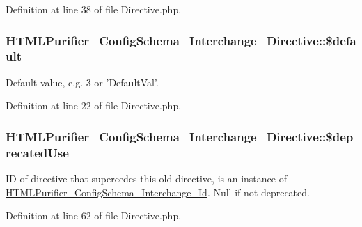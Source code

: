Definition at line 38 of file Directive.\+php.

\hypertarget{classHTMLPurifier__ConfigSchema__Interchange__Directive_a85b4dde959b966c7c449a3a1c82903e9}{
\subsubsection[{\$default}]{\setlength{\rightskip}{0pt plus 5cm}H\+T\+M\+L\+Purifier\+\_\+\+Config\+Schema\+\_\+\+Interchange\+\_\+\+Directive\+::\$default}}\label{classHTMLPurifier__ConfigSchema__Interchange__Directive_a85b4dde959b966c7c449a3a1c82903e9}
Default value, e.\+g. 3 or 'Default\+Val'. 

Definition at line 22 of file Directive.\+php.

\hypertarget{classHTMLPurifier__ConfigSchema__Interchange__Directive_ace5b3be427b3ef113d5eb2ded908c589}{
\subsubsection[{\$deprecated\+Use}]{\setlength{\rightskip}{0pt plus 5cm}H\+T\+M\+L\+Purifier\+\_\+\+Config\+Schema\+\_\+\+Interchange\+\_\+\+Directive\+::\$deprecated\+Use}}\label{classHTMLPurifier__ConfigSchema__Interchange__Directive_ace5b3be427b3ef113d5eb2ded908c589}
I\+D of directive that supercedes this old directive, is an instance of \hyperlink{classHTMLPurifier__ConfigSchema__Interchange__Id}{H\+T\+M\+L\+Purifier\+\_\+\+Config\+Schema\+\_\+\+Interchange\+\_\+\+Id}. Null if not deprecated. 

Definition at line 62 of file Directive.\+php.

